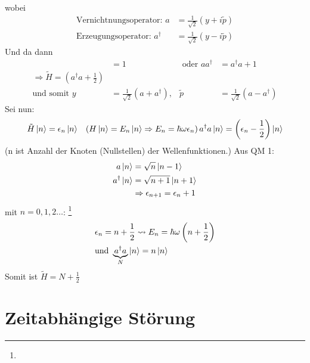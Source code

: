	wobei 
		\begin{align*}
			\text{Vernichtnungsoperator:~} a &= \frac{1}{\sqrt{2}} 
			\left( y + i \tilde{p} \right) \\
			\text{Erzeugungsoperator:~} a^\dagger &= \frac{1}{\sqrt{2}} 
			\left( y - i \tilde{p} \right)
		\end{align*}
	Und da dann
		\begin{align*}
			[a , a^\dagger] &= 1 &\text{~oder~} a a^\dagger &= a^\dagger a + 1 \\
			\Rightarrow \tilde{H} = \left( a^\dagger a + \frac{1}{2} \right)& \\
			\text{und somit~} 
			y &= \frac{1}{\sqrt{2}} \left( a + a^\dagger \right),& 
			\tilde{p} &= \frac{1}{\sqrt{2}} \left( a - a^\dagger \right)
		\end{align*}
	Sei nun:
		\begin{align*}
			\tilde{H} \ket{n} &= \epsilon_n \ket{n} &\left( H \ket{n} = E_n \ket{n} 
			\Rightarrow E_n = \hbar \omega \epsilon_n \right)
			a^\dagger a \ket{n} = \left( \epsilon_n - \frac{1}{2} \right) \ket{n}
		\end{align*}
	(n ist Anzahl der Knoten (Nullstellen) der Wellenfunktionen.)
	Aus QM 1:
		\begin{align*}
			a \ket{n} &= \sqrt{n} \ket{n-1} \\
			a^\dagger \ket {n} &= \sqrt{n+1} \ket{n+1} \\
			&\Rightarrow \epsilon_{n+1} = \epsilon_n + 1
		\end{align*}
	mit $n = 0, 1, 2 \ldots$: \footnote{}
		\begin{align*}
			&\epsilon_n = n + \frac{1}{2} \leadsto E_n = \hbar \omega \left(n + \frac{1}{2} \right) \\
			&\text{und~} \underbrace{a^\dagger a}_{\substack{N}}
			\ket{n} = n \ket{n}
		\end{align*} 
	Somit ist $\tilde{H} = N + \frac{1}{2}$

\section{Zeitabhängige Störung}
